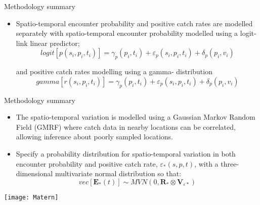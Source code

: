 \documentclass[xcolor=x11names,compress]{beamer}
\renewcommand{\(}{\begin{columns}}
\renewcommand{\)}{\end{columns}}
\newcommand{\<}[1]{\begin{column}{#1}}
\renewcommand{\>}{\end{column}}
\begin{document}
\begin{frame}{Methodology summary}
	\begin{itemize}
	\setlength\itemsep{2em}
	\small

	\item Spatio-temporal encounter probability and positive catch rates
		are modelled separately with spatio-temporal encounter
		probability modelled using a logit-link linear predictor;
		\begin{equation}
			logit[p(s_{i},p_{i},t_{i})] = \gamma_{p}(p_{i},t_{i}) +
			\varepsilon_{p}(s_{i},p_{i},t_{i}) + \delta_{p}(p_{i},
			v_{i})
		\end{equation}

		and positive catch rates modelling using a gamma- distribution
		\begin{equation}
			gamma[r(s_{i},p_{i},t_{i})] = \gamma_{p}(p_{i},t_{i}) +
			\varepsilon_{p}(s_{i},p_{i},t_{i}) + \delta_{p}(p_{i},
			v_{i})
		\end{equation}

\end{itemize}

\end{frame}

\begin{frame}{Methodology summary}
	\begin{itemize}
	\setlength\itemsep{2em}
	\small

	\item The spatio-temporal variation is modelled using a Gaussian
		Markov Random Field (GMRF) where catch data in nearby locations
		can be correlated, allowing inference about poorly sampled
		locations. 
	\item Specify a probability distribution for spatio-temporal
		variation in both encounter probability and positive catch rate, 
		$\varepsilon_{*}(s,p,t)$, with a three-dimensional multivariate 
		normal distribution so that:
		\begin{equation}
			vec[\mathbf{E}_{*}(t)] \sim MVN(0,\mathbf{R}_{*} \otimes
			\mathbf{V}_{{\varepsilon}{*}})
		\end{equation}
	\end{itemize}
	\centering
	\texttt{[image: Matern]}

\end{frame}
\end{document}
